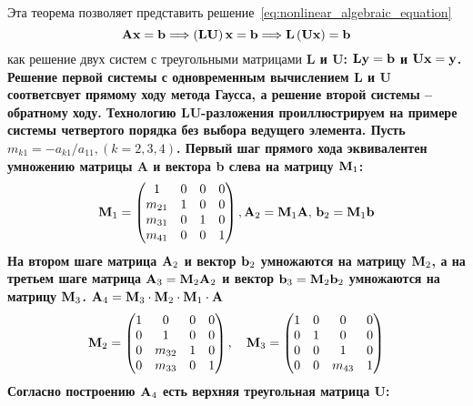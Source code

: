 Эта теорема позволяет представить решение~\eqref{eq:nonlinear_algebraic_equation}
\begin{equation*}
    \bf{A}\bf{x} = \bf{b} \Longrightarrow \left( \bf{L}\bf{U} \right)\bf{x} = \bf{b} \Longrightarrow \bf{L}\left( \bf{U}\bf{x} \right) = \bf{b}
\end{equation*}
как решение двух систем с треугольными матрицами \bf{L} и \bf{U}: $\bf{L}\bf{y} = \bf{b}$ и $\bf{U}\bf{x} = \bf{y}$.
Решение первой системы с одновременным вычислением \bf{L} и \bf{U} соответсвует прямому ходу метода Гаусса, а решение
второй системы -- обратному ходу. Технологию \bf{LU}-разложения проиллюстрируем на примере системы четвертого порядка без
выбора ведущего элемента. Пусть $\displaystyle m_{k1} = -a_{k1}/a_{11}, (k = 2, 3, 4)$. Первый шаг прямого хода
эквивалентен умножению матрицы \bf{A} и вектора \bf{b} слева на матрицу $\bf{M}_1$:
\begin{equation*}
    \bf{M}_1 =
    \begin{pmatrix}
        1      & 0 & 0 & 0 \\
        m_{21} & 1 & 0 & 0 \\
        m_{31} & 0 & 1 & 0 \\
        m_{41} & 0 & 0 & 1
    \end{pmatrix},
    \bf{A}_2 = \bf{M}_1 \bf{A}, \, \bf{b}_2 = \bf{M}_1 \bf{b}
\end{equation*}
На втором шаге матрица $\bf{A}_2$ и вектор $\bf{b}_2$ умножаются на матрицу $\bf{M}_2$, а на третьем шаге матрица
$\bf{A}_3 = \bf{M}_2 \bf{A}_2$ и вектор $\bf{b}_3 = \bf{M}_2 \bf{b}_2 $ умножаются на матрицу $\bf{M}_3$.
$\bf{A}_4 = \bf{M}_3 \cdot \bf{M}_2 \cdot \bf{M}_1 \cdot \bf{A}$
\begin{equation*}
    \bf{M}_2 =
    \begin{pmatrix}
        1 & 0      & 0 & 0 \\
        0 & 1      & 0 & 0 \\
        0 & m_{32} & 1 & 0 \\
        0 & m_{33} & 0 & 1
    \end{pmatrix},
    \quad \bf{M}_3 =
    \begin{pmatrix}
        1 & 0 & 0      & 0 \\
        0 & 1 & 0      & 0 \\
        0 & 0 & 1      & 0 \\
        0 & 0 & m_{43} & 1
    \end{pmatrix}
\end{equation*}
Согласно построению $\bf{A}_4$ есть верхняя треугольная матрица \bf{U}:
